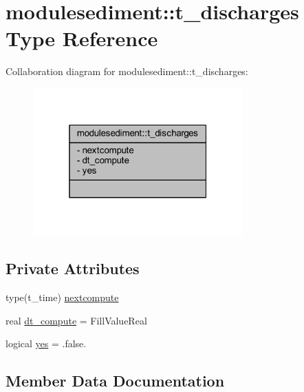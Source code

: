 \hypertarget{structmodulesediment_1_1t__discharges}{}\section{modulesediment\+:\+:t\+\_\+discharges Type Reference}
\label{structmodulesediment_1_1t__discharges}


Collaboration diagram for modulesediment\+:\+:t\+\_\+discharges\+:\nopagebreak
\begin{figure}[H]
\begin{center}
\leavevmode
\includegraphics[width=229pt]{structmodulesediment_1_1t__discharges__coll__graph}
\end{center}
\end{figure}
\subsection*{Private Attributes}
\begin{DoxyCompactItemize}
\item 
type(t\+\_\+time) \mbox{\hyperlink{structmodulesediment_1_1t__discharges_a036f35216074b113823fa127f20196ea}{nextcompute}}
\item 
real \mbox{\hyperlink{structmodulesediment_1_1t__discharges_a98bd88131cf9b2ce16622b422f236103}{dt\+\_\+compute}} = Fill\+Value\+Real
\item 
logical \mbox{\hyperlink{structmodulesediment_1_1t__discharges_a01d5271b8679111b3b34ea865a1cf69c}{yes}} = .false.
\end{DoxyCompactItemize}


\subsection{Member Data Documentation}
\mbox{\label{structmodulesediment_1_1t__discharges_a98bd88131cf9b2ce16622b422f236103}} 

